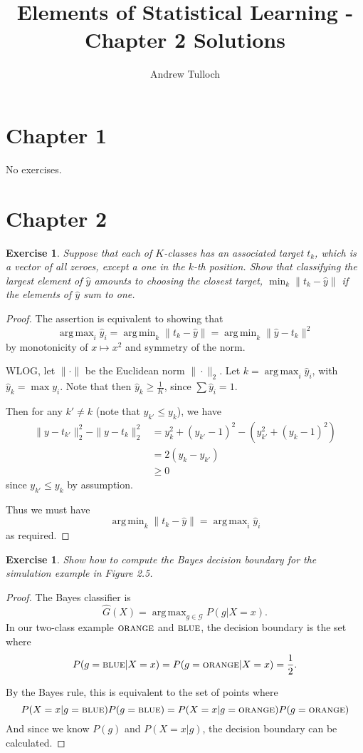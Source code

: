 \documentclass[12pt]{amsart}
\title{Elements of Statistical Learning - Chapter 2 Solutions}								%
\author{Andrew Tulloch}
\theoremstyle{plain}%
\newtheorem{exer}[thm]{Exercise}
\theoremstyle{definition}
\theoremstyle{remark}
\DeclareMathOperator*{\argmax}{arg\,max}
\DeclareMathOperator*{\argmin}{arg\,min}
\begin{document}
\maketitle
\section{Chapter 1}

No exercises.

\section{Chapter 2}
\begin{exer}
    Suppose that each of $K$-classes has an associated target $t_k$, which is a vector of all zeroes, except a one in the $k$-th position.  Show that classifying the largest element of $\hat y$ amounts to choosing the closest target, $\min_k \| t_k - \hat y \|$ if the elements of $\hat y$ sum to one. 
\end{exer}

\begin{proof}
    The assertion is equivalent to showing that \[
    \argmax_i \hat y_i = \argmin_k \| t_k - \hat y \| = \argmin_k \|\hat y - t_k \|^2
\] by monotonicity of $x \mapsto x^2$ and symmetry of the norm.  

WLOG, let $\| \cdot \|$ be the Euclidean norm $\| \cdot \|_2$.  Let $k = \argmax_i \hat y_i$, with $\hat y_k = \max y_i$.  Note that then $\hat y_k \geq \frac{1}{K}$, since $\sum \hat y_i = 1$.   

Then for any $k' \neq k$ (note that $y_{k'} \leq y_k$), we have \begin{align*}
    \| y - t_{k'} \|_2^2 - \| y - t_k \|_2^2 &= y_k^2 + \left(y_{k'} - 1 \right)^2 - \left( y_{k'}^2 + \left(y_k - 1 \right)^2 \right) \\
    &= 2 \left(y_k - y_{k'}\right) \\
    &\geq 0
\end{align*} since $y_{k'} \leq y_k$ by assumption.

Thus we must have \[
    \argmin_k \| t_k - \hat y \| = \argmax_i \hat y_i
\] as required.    
\end{proof}

\begin{exer}
    Show how to compute the Bayes decision boundary for the simulation example in Figure 2.5.
\end{exer}

\begin{proof}
    The Bayes classifier is \[
        \hat G(X) = \argmax_{g \in \mathcal G} P(g | X = x ).
    \] In our two-class example $\textsc{orange}$ and $\textsc{blue}$, the decision boundary is the set where \[
        P(g=\textsc{blue} | X = x) = P(g =\textsc{orange} | X = x) = \frac{1}{2}.
    \]  
    
    By the Bayes rule, this is equivalent to the set of points where \[
        P(X = x | g = \textsc{blue}) P(g = \textsc{blue}) = P(X = x | g = \textsc{orange}) P(g = \textsc{orange})
    \] And since we know $P(g)$ and $P(X=x|g)$, the decision boundary can be calculated.
\end{proof}
\end{document}
